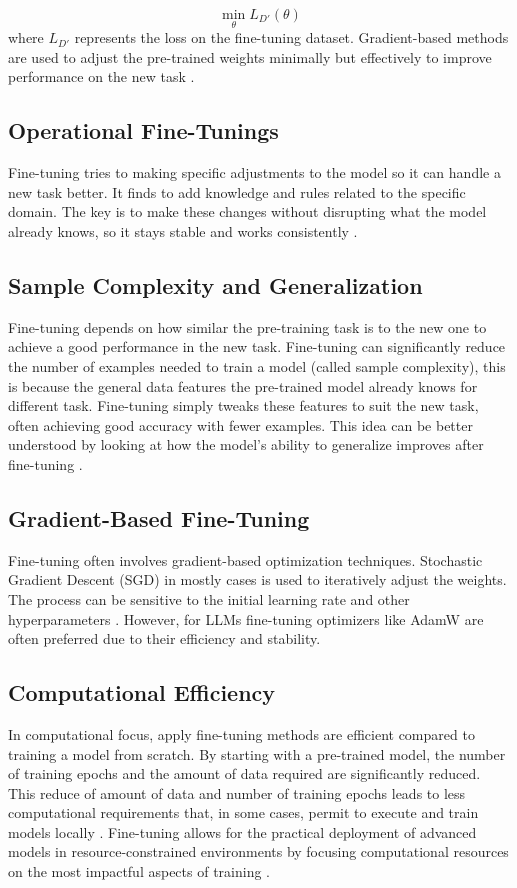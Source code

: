 \[
\min_{\theta} L_{D'}(\theta)
\]
where $L_{D'}$ represents the loss on the fine-tuning dataset. Gradient-based methods are used to adjust the pre-trained weights minimally but effectively to improve performance on the new task \citep{Lalor2017Improving}.

\subsection{Operational Fine-Tunings}
Fine-tuning tries to making specific adjustments to the model so it can handle a new task better. It finds to add knowledge and rules related to the specific domain. The key is to make these changes without disrupting what the model already knows, so it stays stable and works consistently \citep{Catani2020A}.

\subsection{Sample Complexity and Generalization}
Fine-tuning depends on how similar the pre-training task is to the new one to achieve a good performance in the new task. Fine-tuning can significantly reduce the number of examples needed to train a model (called sample complexity), this is because the general data features the pre-trained model already knows for different task. Fine-tuning simply tweaks these features to suit the new task, often achieving good accuracy with fewer examples. This idea can be better understood by looking at how the model's ability to generalize improves after fine-tuning \citep{Shachaf2021A}.

\subsection{Gradient-Based Fine-Tuning}
Fine-tuning often involves gradient-based optimization techniques. Stochastic Gradient Descent (SGD) in mostly cases is used to iteratively adjust the weights. The process can be sensitive to the initial learning rate and other hyperparameters \citep{Vrbancic2020Transfer}. However, for LLMs fine-tuning optimizers like AdamW \citep{loshchilov2019decoupledweightdecayregularization} are often preferred due to their efficiency and stability.

\subsection{Computational Efficiency}
In computational focus, apply fine-tuning methods are efficient compared to training a model from scratch. By starting with a pre-trained model, the number of training epochs and the amount of data required are significantly reduced. This reduce of amount of data and number of training epochs leads to less computational requirements that, in some cases, permit to execute and train models locally \citep{Shi2023Towards}. Fine-tuning allows for the practical deployment of advanced models in resource-constrained environments by focusing computational resources on the most impactful aspects of training \citep{Xiao2023Offsite-Tuning:}.

